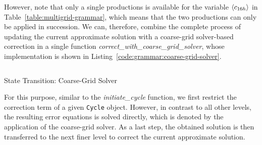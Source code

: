 However, note that only a single productions is available for the variable $\langle c_{16h} \rangle$ in Table~\ref{table:multigrid-grammar}, which means that the two productions can only be applied in succession.
We can, therefore, combine the complete process of updating the current approximate solution with a coarse-grid solver-based correction in a single function \emph{correct\_with\_coarse\_grid\_solver}, whose implementation is shown in Listing~\ref{code:grammar:coarse-grid-solver}.
\begin{listing}
	\inputminted{python}{evostencils/grammar/coarse_grid_solver.py}
	\caption{State Transition: Coarse-Grid Solver}
	\label{code:grammar:coarse-grid-solver}
\end{listing}
For this purpose, similar to the \emph{initiate\_cycle} function, we first restrict the correction term of a given \texttt{Cycle} object.
However, in contrast to all other levels, the resulting error equations is solved directly, which is denoted by the application of the coarse-grid solver.
As a last step, the obtained solution is then transferred to the next finer level to correct the current approximate solution.
